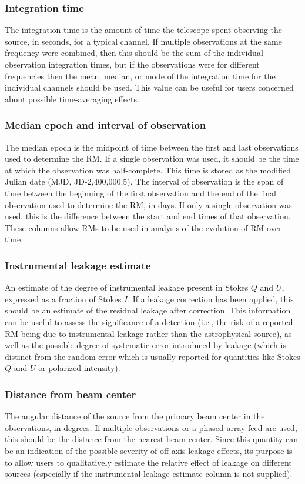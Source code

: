 \documentclass[10pt,modern]{aastex63}
\begin{document}
\subsubsection{Integration time}
The integration time is the amount of time the telescope spent observing the source, in seconds, for a typical channel. If multiple observations at the same frequency were combined, then this should be the sum of the individual observation integration times, but if the observations were for different frequencies then the mean, median, or mode of the integration time for the individual channels should be used. This value can be useful for users concerned about possible time-averaging effects.

\subsubsection{Median epoch and interval of observation}
The median epoch is the midpoint of time between the first and last observations used to determine the RM. If a single observation was used, it should be the time at which the observation was half-complete. This time is stored as the modified Julian date (MJD, JD-2,400,000.5). The interval of observation is the span of time between the beginning of the first observation and the end of the final observation used to determine the RM, in days. If only a single observation was used, this is the difference between the start and end times of that observation. These columns allow RMs to be used in analysis of the evolution of RM over time.

\subsubsection{Instrumental leakage estimate}
An estimate of the degree of instrumental leakage present in Stokes $Q$ and $U$, expressed as a fraction of Stokes $I$. If a leakage correction has been applied, this should be an estimate of the residual leakage after correction. This information can be useful to assess the significance of a detection (i.e., the risk of a reported RM being due to instrumental leakage rather than the astrophysical source), as well as the possible degree of systematic error introduced by leakage (which is distinct from the random error which is usually reported for quantities like Stokes $Q$ and $U$ or polarized intensity).

\subsubsection{Distance from beam center}
The angular distance of the source from the primary beam center in the observations, in degrees. If multiple observations or a phased array feed are used, this should be the distance from the nearest beam center. Since this quantity can be an indication of the possible severity of off-axis leakage effects, its purpose is to allow users to qualitatively estimate the relative effect of leakage on different sources (especially if the instrumental leakage estimate column is not supplied).
\end{document}
